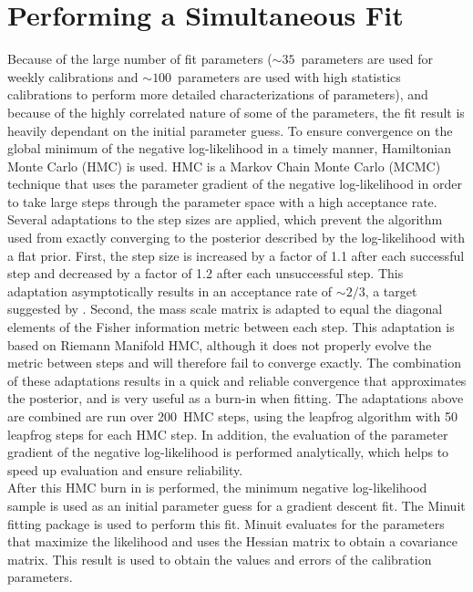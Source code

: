 \documentclass[/main.tex]{subfiles}
\begin{document}
\section{Performing a Simultaneous Fit} \label{sec:fitter}
Because of the large number of fit parameters (${\sim}35$~parameters are used for weekly calibrations and ${\sim}100$~parameters are used with high statistics calibrations to perform more detailed characterizations of parameters), and because of the highly correlated nature of some of the parameters, the fit result is heavily dependant on the initial parameter guess.
To ensure convergence on the global minimum of the negative log-likelihood in a timely manner, Hamiltonian Monte Carlo (HMC) is used\cite{DUANE1987}\cite{2012Neal}.
HMC is a Markov Chain Monte Carlo (MCMC) technique that uses the parameter gradient of the negative log-likelihood in order to take large steps through the parameter space with a high acceptance rate.
Several adaptations to the step sizes are applied, which prevent the algorithm used from exactly converging to the posterior described by the log-likelihood with a flat prior.
First, the step size is increased by a factor of 1.1 after each successful step and decreased by a factor of 1.2 after each unsuccessful step.
This adaptation asymptotically results in an acceptance rate of ${\sim}2/3$, a target suggested by \cite{2012Neal}.
Second, the mass scale matrix is adapted to equal the diagonal elements of the Fisher information metric between each step.
This adaptation is based on Riemann Manifold HMC\cite{Girolami2011}, although it does not properly evolve the metric between steps and will therefore fail to converge exactly.
The combination of these adaptations results in a quick and reliable convergence that approximates the posterior, and is very useful as a burn-in when fitting.
The adaptations above are combined are run over 200~HMC steps, using the leapfrog algorithm with 50 leapfrog steps for each HMC step.
In addition, the evaluation of the parameter gradient of the negative log-likelihood is performed analytically, which helps to speed up evaluation and ensure reliability.
\\
After this HMC burn in is performed, the minimum negative log-likelihood sample is used as an initial parameter guess for a gradient descent fit.
The Minuit fitting package is used to perform this fit\cite{minuit}.
Minuit evaluates for the parameters that maximize the likelihood and uses the Hessian matrix to obtain a covariance matrix.
This result is used to obtain the values and errors of the calibration parameters.
\\
\end{document}
